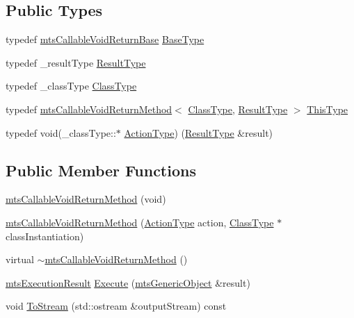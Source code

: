 \subsection*{Public Types}
\begin{DoxyCompactItemize}
\item 
typedef \hyperlink{classmts_callable_void_return_base}{mts\+Callable\+Void\+Return\+Base} \hyperlink{classmts_callable_void_return_method_a01907ccc09041bebecb2085a84f74bb1}{Base\+Type}
\item 
typedef \+\_\+result\+Type \hyperlink{classmts_callable_void_return_method_af01afd5ee66910d12e6fc9703a976260}{Result\+Type}
\item 
typedef \+\_\+class\+Type \hyperlink{classmts_callable_void_return_method_a2bea77e5dd239ec2a1d3558dd3ca1776}{Class\+Type}
\item 
typedef \hyperlink{classmts_callable_void_return_method}{mts\+Callable\+Void\+Return\+Method}$<$ \hyperlink{classmts_callable_void_return_method_a2bea77e5dd239ec2a1d3558dd3ca1776}{Class\+Type}, \hyperlink{classmts_callable_void_return_method_af01afd5ee66910d12e6fc9703a976260}{Result\+Type} $>$ \hyperlink{classmts_callable_void_return_method_a03bdd60bba7b2b001dd94270d8a27a5f}{This\+Type}
\item 
typedef void(\+\_\+class\+Type\+::$\ast$ \hyperlink{classmts_callable_void_return_method_a8fcdd120f008efea73b3d51cbb34f773}{Action\+Type}) (\hyperlink{classmts_callable_void_return_method_af01afd5ee66910d12e6fc9703a976260}{Result\+Type} \&result)
\end{DoxyCompactItemize}
\subsection*{Public Member Functions}
\begin{DoxyCompactItemize}
\item 
\hyperlink{classmts_callable_void_return_method_a98d4891da35626a8e9f924c98c75fa7b}{mts\+Callable\+Void\+Return\+Method} (void)
\item 
\hyperlink{classmts_callable_void_return_method_a2cfed63557476b9bdf5995654ed903b8}{mts\+Callable\+Void\+Return\+Method} (\hyperlink{classmts_callable_void_return_method_a8fcdd120f008efea73b3d51cbb34f773}{Action\+Type} action, \hyperlink{classmts_callable_void_return_method_a2bea77e5dd239ec2a1d3558dd3ca1776}{Class\+Type} $\ast$class\+Instantiation)
\item 
virtual \hyperlink{classmts_callable_void_return_method_a5ce2600e928bc28ec4c973636307860f}{$\sim$mts\+Callable\+Void\+Return\+Method} ()
\item 
\hyperlink{classmts_execution_result}{mts\+Execution\+Result} \hyperlink{classmts_callable_void_return_method_a815dd28e94497e91cb0ed1e891a35dad}{Execute} (\hyperlink{classmts_generic_object}{mts\+Generic\+Object} \&result)
\item 
void \hyperlink{classmts_callable_void_return_method_a2ca736ce45432c5cd746227795253ea3}{To\+Stream} (std\+::ostream \&output\+Stream) const 
\end{DoxyCompactItemize}
